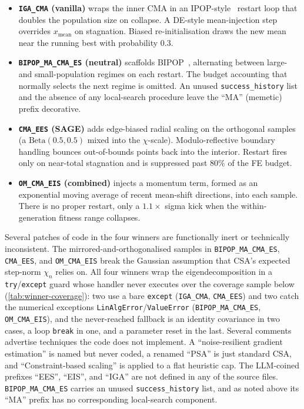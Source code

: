 \begin{itemize}
  \item \textbf{\texttt{IGA\_CMA} (vanilla)} wraps the inner CMA in an IPOP-style~\cite{ipop2005} restart loop that doubles the population size on collapse. A DE-style mean-injection step overrides $x_{\text{mean}}$ on stagnation. Biased re-initialisation draws the new mean near the running best with probability $0.3$.
  \item \textbf{\texttt{BIPOP\_MA\_CMA\_ES} (neutral)} scaffolds BIPOP~\cite{bipop2009}, alternating between large- and small-population regimes on each restart. The budget accounting that normally selects the next regime is omitted. An unused \texttt{success\_history} list and the absence of any local-search procedure leave the ``MA'' (memetic) prefix decorative.
  \item \textbf{\texttt{CMA\_EES} (SAGE)} adds edge-biased radial scaling on the orthogonal samples (a $\text{Beta}(0.5, 0.5)$ mixed into the $\chi$-scale). Modulo-reflective boundary handling bounces out-of-bounds points back into the interior. Restart fires only on near-total stagnation and is suppressed past $80\%$ of the FE budget.
  \item \textbf{\texttt{OM\_CMA\_EIS} (combined)} injects a momentum term, formed as an exponential moving average of recent mean-shift directions, into each sample. There is no proper restart, only a $1.1\times$ sigma kick when the within-generation fitness range collapses.
\end{itemize}

Several patches of code in the four winners are functionally inert or technically inconsistent. The mirrored-and-orthogonalised samples in \texttt{BIPOP\_MA\_CMA\_ES}, \texttt{CMA\_EES}, and \texttt{OM\_CMA\_EIS} break the Gaussian assumption that CSA's expected step-norm $\chi_n$ relies on. All four winners wrap the eigendecomposition in a \texttt{try}/\texttt{except} guard whose handler never executes over the coverage sample below (\cref{tab:winner-coverage}): two use a bare \texttt{except} (\texttt{IGA\_CMA}, \texttt{CMA\_EES}) and two catch the numerical exceptions \texttt{LinAlgError}/\texttt{ValueError} (\texttt{BIPOP\_MA\_CMA\_ES}, \texttt{OM\_CMA\_EIS}), and the never-reached fallback is an identity covariance in two cases, a loop \texttt{break} in one, and a parameter reset in the last. Several comments advertise techniques the code does not implement. A ``noise-resilient gradient estimation'' is named but never coded, a renamed ``PSA'' is just standard CSA, and ``Constraint-based scaling'' is applied to a flat heuristic cap. The LLM-coined prefixes ``EES'', ``EIS'', and ``IGA'' are not defined in any of the source files. \texttt{BIPOP\_MA\_CMA\_ES} carries an unused \texttt{success\_history} list, and as noted above its ``MA'' prefix has no corresponding local-search component.

